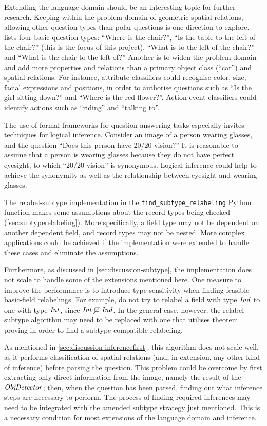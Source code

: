 Extending the language domain should be an interesting topic for further research.
Keeping within the problem domain of geometric spatial relations, allowing other question types than polar questions is one direction to explore.
\citet[p. 156]{DobnikTeachingmobilerobots2009} lists four basic question types:
``Where is the chair?'',
``Is the table to the left of the chair?'' (this is the focus of this project),
``What is to the left of the chair?'' and
``What is the chair to the left of?''
Another is to widen the problem domain and add more properties and relations than a primary object class (``car'') and spatial relations.
For instance, attribute classifiers could recognise color, size, facial expressions and positions, in order to authorise questions such as ``Is the girl sitting down?'' and ``Where is the red flower?''.
Action event classifiers could identify actions such as ``riding'' and ``talking to''.

The use of formal frameworks for question-answering tasks especially invites techniques for logical inference.
Consider an image of a person wearing glasses, and the question ``Does this person have 20/20 vision?''
It is reasonable to assume that a person is wearing glasses because they do not have perfect eyesight, to which ``20/20 vision'' is synonymous.
Logical inference could help to achieve the synonymity as well as the relationship between eyesight and wearing glasses.

The relabel-subtype implementation in the \texttt{find\_subtype\_relabeling} Python function makes some assumptions about the record types being checked (\autoref{sec:subtyperelabeling}).
More specifically, a field type may not be dependent on another dependent field, and record types may not be nested.
More complex applications could be achieved if the implementation were extended to handle these cases and eliminate the assumptions.

Furthermore, as discussed in \autoref{sec:discussion-subtype}, the implementation does not scale to handle some of the extensions mentioned here.
One measure to improve the performance is to introduce type-sensitivity when finding feasible basic-field relabelings.
For example, do not try to relabel a field with type $\mathit{Ind}$ to one with type $\mathit{Int}$, since $\mathit{Int} \mathrel{\cancel\sqsubseteq} \mathit{Ind}$.
In the general case, however, the relabel-subtype algorithm may need to be replaced with one that utilises theorem proving in order to find a subtype-compatible relabeling.

As mentioned in \autoref{sec:discussion-inferencefirst}, this algorithm does not scale well, as it performs classification of spatial relations (and, in extension, any other kind of inference) before parsing the question.
This problem could be overcome by first extracting only direct information from the image, namely the result of the $\mathit{ObjDetector}$;
then, when the question has been parsed, finding out what inference steps are necessary to perform.
The process of finding required inferences may need to be integrated with the amended subtype strategy just mentioned.
This is a necessary condition for most extensions of the language domain and inference.

